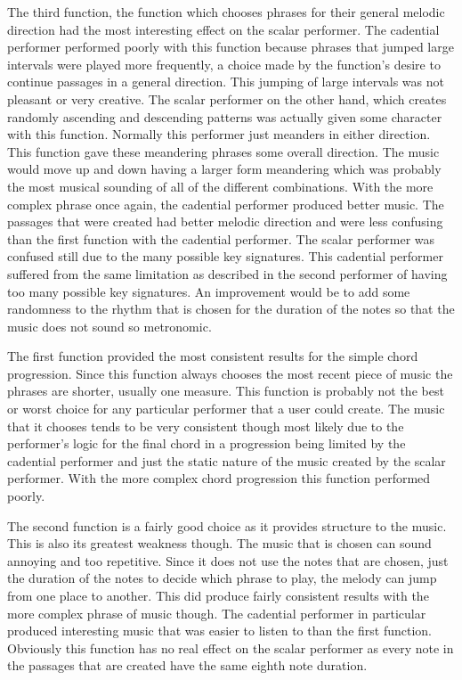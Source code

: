 \documentclass[12pt]{ucthesis}
\begin{document}
The third function, the function which chooses phrases for their general melodic direction had the most interesting effect on the scalar performer. The cadential performer performed poorly with this function because phrases that jumped large intervals were played more frequently, a choice made by the function's desire to continue passages in a general direction. This jumping of large intervals was not pleasant or very creative. The scalar performer on the other hand, which creates randomly ascending and descending patterns was actually given some character with this function. Normally this performer just meanders in either direction. This function gave these meandering phrases some overall direction. The music would move up and down having a larger form meandering which was probably the most musical sounding of all of the different combinations. With the more complex phrase once again, the cadential performer produced better music. The passages that were created had better melodic direction and were less confusing than the first function with the cadential performer. The scalar performer was confused still due to the many possible key signatures. This cadential performer suffered from the same limitation as described in the second performer of having too many possible key signatures.  An improvement would be to add some randomness to the rhythm that is chosen for the duration of the notes so that the music does not sound so metronomic. 

The first function provided the most consistent results for the simple chord progression. Since this function always chooses the most recent piece of music the phrases are shorter, usually one measure. This function is probably not the best or worst choice for any particular performer that a user could create. The music that it chooses tends to be very consistent though most likely due to the performer's logic for the final chord in a progression being limited by the cadential performer and just the static nature of the music created by the scalar performer.  With the more complex chord progression this function performed poorly.

The second function is a fairly good choice as it provides structure to the music. This is also its greatest weakness though. The music that is chosen can sound annoying and too repetitive. Since it does not use the notes that are chosen, just the duration of the notes to decide which phrase to play, the melody can jump from one place to another. This did produce fairly consistent results with the more complex phrase of music though. The cadential performer in particular produced interesting music that was easier to listen to than the first function. Obviously this function has no real effect on the scalar performer as every note in the passages that are created have the same eighth note duration.
\end{document}

